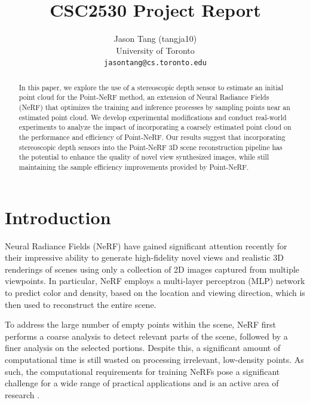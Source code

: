 \documentclass[10pt,twocolumn,letterpaper]{article}
\begin{document}
\title{CSC2530 Project Report}

\author{Jason Tang (tangja10)\\
University of Toronto\\
{\tt\small jasontang@cs.toronto.edu}
}
\maketitle

\begin{abstract}
  In this paper, we explore the use of a stereoscopic depth sensor to estimate an initial point cloud for the Point-NeRF method, an extension of Neural Radiance Fields (NeRF) that optimizes the training and inference processes by sampling points near an estimated point cloud. We develop experimental modifications and conduct real-world experiments to analyze the impact of incorporating a coarsely estimated point cloud on the performance and efficiency of Point-NeRF. Our results suggest that incorporating stereoscopic depth sensors into the Point-NeRF 3D scene reconstruction pipeline has the potential to enhance the quality of novel view synthesized images, while still maintaining the sample efficiency improvements provided by Point-NeRF.
\end{abstract}

\section{Introduction}
\label{sec:intro}
Neural Radiance Fields (NeRF) \cite{NeRF} have gained significant attention recently for their impressive ability to generate high-fidelity novel views and realistic 3D renderings of scenes using only a collection of 2D images captured from multiple viewpoints. In particular, NeRF employs a multi-layer perceptron (MLP) network to predict color and density, based on the location and viewing direction, which is then used to reconstruct the entire scene.

To address the large number of empty points within the scene, NeRF first performs a coarse analysis to detect relevant parts of the scene, followed by a finer analysis on the selected portions. Despite this, a significant amount of computational time is still wasted on processing irrelevant, low-density points. As such, the computational requirements for training NeRFs pose a significant challenge for a wide range of practical applications and is an active area of research \cite{EfficientNeRF}.
\end{document}

